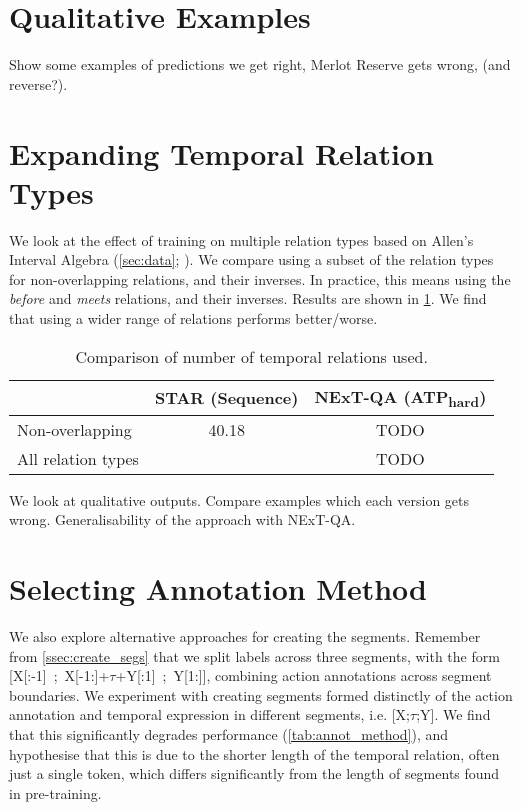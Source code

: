 \section{Qualitative Examples}
\label{sec:qualresults}

Show some examples of predictions we get right, Merlot Reserve gets wrong,
(and reverse?).

\section{Expanding Temporal Relation Types}
\label{sec:expandtemprel}

We look at the effect of training on multiple relation types based on Allen's
Interval Algebra (\cref{sec:data}; \citet{allen1983interval}). We compare using
a subset of the relation types for non-overlapping relations, and their
inverses. In practice, this means using the \textit{before} and \textit{meets}
relations, and their inverses. Results are shown in \cref{tab:expandtemprel}.
We find that using a wider range of relations performs better/worse.

\begin{table}[t]
	\centering
	\caption{Comparison of number of temporal relations used.}
	\label{tab:expandtemprel}
	\begin{tabular}{lcc}
		\toprule
		& STAR (Sequence) & NExT-QA (ATP\textsubscript{hard}) \\
		\midrule
		Non-overlapping & 40.18 & TODO \\
		All relation types & & TODO \\
		\bottomrule
	\end{tabular}
\end{table}

We look at qualitative outputs. Compare examples which each version gets wrong.
Generalisability of the approach with NExT-QA.

\section{Selecting Annotation Method}
\label{sec:annot_method}

We also explore alternative approaches for creating the segments. Remember from
\cref{ssec:create_segs} that we split labels across three segments, with the
form \mbox{[X[:-1]~;~X[-1:]+$\tau$+Y[:1]~;~Y[1:]]}, combining action
annotations across segment boundaries. We experiment with creating segments
formed distinctly of the action annotation and temporal expression in different
segments, i.e. \mbox{[X;$\tau$;Y]}. We find that this significantly degrades
performance (\cref{tab:annot_method}), and hypothesise that this is due to the
shorter length of the temporal relation, often just a single token, which
differs significantly from the length of segments found in pre-training.

